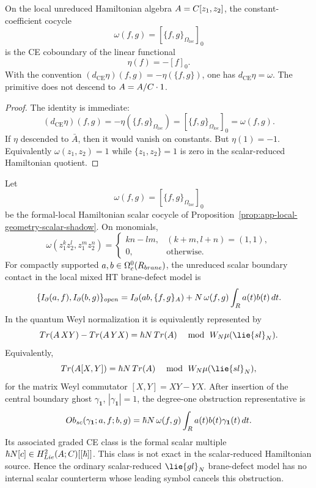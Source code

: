 \begin{lem}
\label{lem:app-unreduced-scalar-primitive}
  On the local unreduced Hamiltonian algebra \(A=C[z_1,z_2]\), the
  constant-coefficient cocycle
  \[
    \omega(f,g)=[\{f,g\}_{\Omega_{\mathrm{loc}}}]_0
  \]
  is the CE coboundary of the linear functional
  \[
    \eta(f)=-[f]_0 .
  \]
  With the convention
  \((d_{\mathrm{CE}}\eta)(f,g)=-\eta(\{f,g\})\), one has
  \(d_{\mathrm{CE}}\eta=\omega\).  The primitive does not descend to
  \(A=A/C\cdot1\).
\end{lem}

\begin{proof}
  The identity is immediate:
  \[
    (d_{\mathrm{CE}}\eta)(f,g)
      =-\eta(\{f,g\}_{\Omega_{\mathrm{loc}}})
      =[\{f,g\}_{\Omega_{\mathrm{loc}}}]_0
      =\omega(f,g).
  \]
  If \(\eta\) descended to \(\bar A\), then it would vanish on
  constants.  But \(\eta(1)=-1\).  Equivalently
  \(\omega(z_1,z_2)=1\) while \(\{z_1,z_2\}=1\) is zero in the
  scalar-reduced Hamiltonian quotient.
\end{proof}

\begin{thm}
\label{thm:app-scalar-contact-qme-class}
  Let
  \[
    \omega(f,g)=[\{f,g\}_{\Omega_{\mathrm{loc}}}]_0
  \]
  be the formal-local Hamiltonian scalar cocycle of
  Proposition~\ref{prop:app-local-geometry-scalar-shadow}.  On monomials,
  \[
    \omega(z_1^kz_2^l,z_1^mz_2^n)=
    \begin{cases}
      kn-lm,&(k+m,l+n)=(1,1),\\
      0,&\text{otherwise.}
    \end{cases}
  \]
  For compactly supported \(a,b\in\Omega^0_c(R_{brane})\), the
  unreduced scalar boundary contact in the local mixed HT brane-defect
  model is
  \[
    \{I_\partial(a,f),I_\partial(b,g)\}_{open}
    =
    I_\partial(ab,\{f,g\}_{A})
    +N\,\omega(f,g)\int_{R} a(t)b(t)\,dt .
  \]
  In the quantum Weyl normalization it is equivalently represented by
  \[
    \operatorname{Tr}(A\,XY)-\operatorname{Tr}(A\,YX)
      =
      \hbar N\,\operatorname{Tr}(A)
      \quad\bmod\ \mathcal W_N\widehat\mu(\lie{sl}_N).
  \]
  Equivalently,
  \[
    \operatorname{Tr}(A[X,Y])
      =\hbar N\,\operatorname{Tr}(A)
      \quad\bmod\ \mathcal W_N\widehat\mu(\lie{sl}_N),
  \]
  for the matrix Weyl commutator \([X,Y]=XY-YX\).
  After insertion of the central boundary ghost
  \(\gamma_{\mathbf 1}\), \(|\gamma_{\mathbf 1}|=1\), the degree-one
  obstruction representative is
  \[
    Ob_{sc}(\gamma_{\mathbf 1};a,f;b,g)
    =
    \hbar N\,\omega(f,g)
    \int_{R} a(t)b(t)\gamma_{\mathbf 1}(t)\,dt .
  \]
  Its associated graded CE class is the formal scalar multiple
  \(\hbar N[c]\in H^2_{Lie}(A;C)[[\hbar]]\).  This
  class is not exact in the scalar-reduced Hamiltonian source.  Hence the
  ordinary scalar-reduced \(\lie{gl}_N\) brane-defect model has no
  internal scalar counterterm whose leading symbol cancels this
  obstruction.
\end{thm}

